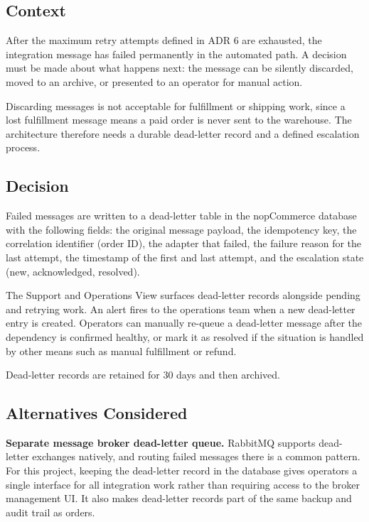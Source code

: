 \subsection{Context}

After the maximum retry attempts defined in ADR 6 are exhausted, the integration message has
failed permanently in the automated path. A decision must be made about what happens next:
the message can be silently discarded, moved to an archive, or presented to an operator for
manual action.

Discarding messages is not acceptable for fulfillment or shipping work, since a lost
fulfillment message means a paid order is never sent to the warehouse. The architecture
therefore needs a durable dead-letter record and a defined escalation process.

\subsection{Decision}

Failed messages are written to a dead-letter table in the nopCommerce database with the
following fields: the original message payload, the idempotency key, the correlation identifier
(order ID), the adapter that failed, the failure reason for the last attempt, the timestamp of
the first and last attempt, and the escalation state (new, acknowledged, resolved).

The Support and Operations View surfaces dead-letter records alongside pending and retrying
work. An alert fires to the operations team when a new dead-letter entry is created. Operators
can manually re-queue a dead-letter message after the dependency is confirmed healthy, or mark
it as resolved if the situation is handled by other means such as manual fulfillment or refund.

Dead-letter records are retained for 30 days and then archived.

\subsection{Alternatives Considered}

\textbf{Separate message broker dead-letter queue.} RabbitMQ supports dead-letter exchanges
natively, and routing failed messages there is a common pattern. For this project, keeping the
dead-letter record in the database gives operators a single interface for all integration work
rather than requiring access to the broker management UI. It also makes dead-letter records
part of the same backup and audit trail as orders.

